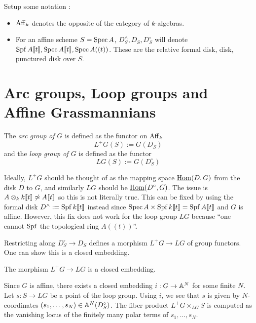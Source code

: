 \documentclass{article}
\begin{document}
Setup some notation : 
\begin{itemize}
  \item $\mathrm{Aff}_k$ denotes the opposite of the category of $k$-algebras.
  \item For an affine scheme $S = \operatorname{Spec} A$,
  $D^\wedge_S , D_S , D_S^\circ$ will denote
  $\operatorname{Spf} A\llbracket t \rrbracket , \operatorname{Spec} A\llbracket t \rrbracket , \operatorname{Spec} A((t))$.
  These are the relative formal disk, disk, punctured disk over $S$.
\end{itemize}

\tableofcontents  

\section{Arc groups, Loop groups and Affine Grassmannians}

\begin{dfn}
  
  The \emph{arc group of $G$} is defined as the functor on $\mathrm{Aff}_k$
  \[
    L^+G(S) := G(D_S)
  \]
  and the \emph{loop group of $G$} is defined as the functor
  \[
    LG(S) := G(D_S^\circ)
  \]
\end{dfn}

Ideally, $L^+G$ should be thought of as
the mapping space $\underline{\mathrm{Hom}}(D , G)$ from the disk $D$ to $G$,
and similarly $LG$ should be $\underline{\mathrm{Hom}}(D^\circ , G)$.
The issue is $A \otimes_k k\llbracket t \rrbracket \not\simeq A\llbracket t \rrbracket$ so
this is not literally true.
This can be fixed by using the formal disk $D^\wedge := \operatorname{Spf} k\llbracket t \rrbracket$ instead
since $\operatorname{Spec} A \times \operatorname{Spf} k\llbracket t \rrbracket = \operatorname{Spf} A\llbracket t \rrbracket$
and $G$ is affine.
However, this fix does not work for the loop group $LG$ because
``one cannot $\operatorname{Spf}$ the topological ring $A((t))$''.

Restricting along $D_S^\circ \to D_S$ defines a
morphism $L^+G \to LG$ of group functors.
One can show this is a closed embedding.
\begin{lem}
  The morphism $L^+G \to LG$ is a closed embedding.
  \begin{proof1}
    Since $G$ is affine,
    there exists a closed embedding $i : G \to \mathbb{A}^N$ for some finite $N$.
    Let $s : S \to LG$ be a point of the loop group.
    Using $i$, we see that $s$ is given by $N$-coordinates
    $(s_1 , \dots , s_N) \in \mathbb{A}^N(D_S^\circ)$.
    The fiber product $L^+ G \times_{LG} S$ is computed as
    the vanishing locus of the finitely many polar terms
    of $s_1 , \dots, s_N$.
  \end{proof1}
\end{lem}
\end{document}
